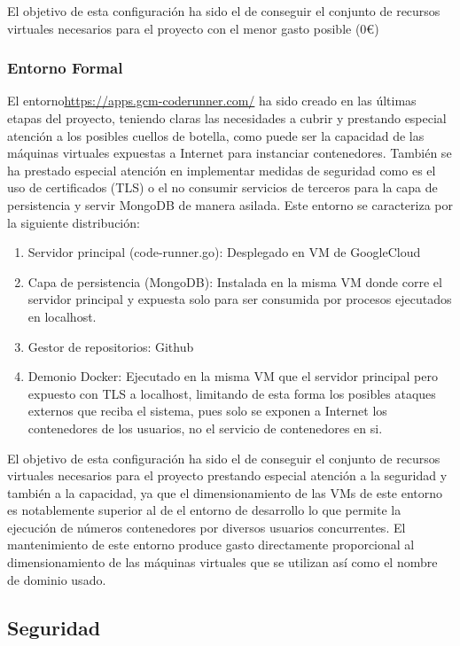 \documentclass[a4paper,11pt]{book}
\begin{document}
El objetivo de esta configuración ha sido el de conseguir el conjunto de recursos virtuales necesarios para el proyecto con el menor gasto posible (0€)

\subsubsection{Entorno Formal}

El entorno\url{https://apps.gcm-coderunner.com/} ha sido creado en las últimas etapas del proyecto, teniendo claras las necesidades a cubrir y prestando especial atención a los posibles cuellos de botella, como puede ser la capacidad de las máquinas virtuales expuestas a Internet para instanciar contenedores.  También se ha prestado especial atención en implementar medidas de seguridad como es el uso de certificados (TLS) o el no consumir servicios de terceros para la capa de persistencia y servir MongoDB de manera asilada. Este entorno se caracteriza por la siguiente distribución: 

\begin{enumerate}
\item Servidor principal (code-runner.go): Desplegado en VM de GoogleCloud\cite{gcp}
\item Capa de persistencia (MongoDB): Instalada en la misma VM donde corre el servidor principal y expuesta solo para ser consumida por procesos ejecutados en localhost. 
\item Gestor de repositorios: Github\cite{github}
\item Demonio Docker: Ejecutado en la misma VM que el servidor principal  pero expuesto con TLS a localhost, limitando de esta forma los posibles ataques externos que reciba el sistema, pues solo se exponen a Internet los contenedores de los usuarios, no el servicio de contenedores en si. 
\end{enumerate}


El objetivo de esta configuración ha sido el de conseguir el conjunto de recursos virtuales necesarios para el proyecto prestando especial atención a la seguridad y también a la capacidad, ya que el dimensionamiento de las VMs de este entorno es notablemente superior al de el entorno de desarrollo lo que permite la ejecución de números contenedores por diversos usuarios concurrentes.  El mantenimiento de este entorno produce gasto directamente proporcional al dimensionamiento de las máquinas virtuales que se utilizan así como el nombre de dominio usado. 

\subsection{Seguridad}
\end{document}
